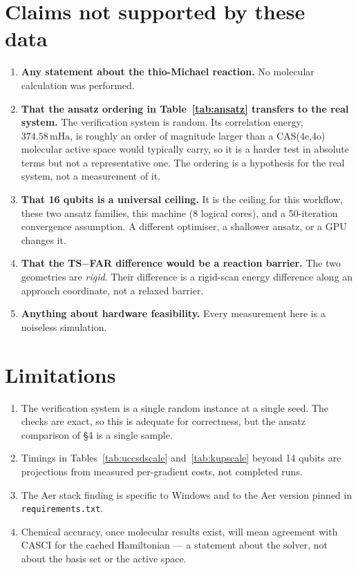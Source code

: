 \documentclass[11pt,a4paper]{article}
\newcommand{\mHa}{\ensuremath{\,\mathrm{mHa}}}
\newcommand{\code}[1]{\texttt{\small #1}}
\begin{document}
\section{Claims not supported by these data}

\begin{enumerate}[leftmargin=1.4em,itemsep=0.3em]

\item \textbf{Any statement about the thio-Michael reaction.} No molecular
  calculation was performed.

\item \textbf{That the ansatz ordering in Table~\ref{tab:ansatz} transfers to
  the real system.} The verification system is random. Its correlation energy,
  $374.58\mHa$, is roughly an order of magnitude larger than a CAS(4e,4o)
  molecular active space would typically carry, so it is a harder test in
  absolute terms but not a representative one. The ordering is a hypothesis for
  the real system, not a measurement of it.

\item \textbf{That 16 qubits is a universal ceiling.} It is the ceiling for
  this workflow, these two ansatz families, this machine (8 logical cores), and
  a 50-iteration convergence assumption. A different optimiser, a shallower
  ansatz, or a GPU changes it.

\item \textbf{That the TS$-$FAR difference would be a reaction barrier.} The two
  geometries are \emph{rigid}. Their difference is a rigid-scan energy
  difference along an approach coordinate, not a relaxed barrier.

\item \textbf{Anything about hardware feasibility.} Every measurement here is a
  noiseless simulation.

\end{enumerate}

\section{Limitations}

\begin{enumerate}[leftmargin=1.4em,itemsep=0.2em]
\item The verification system is a single random instance at a single seed. The
  checks are exact, so this is adequate for correctness, but the ansatz
  comparison of \S4 is a single sample.
\item Timings in Tables~\ref{tab:uccsdscale} and~\ref{tab:kupscale} beyond 14
  qubits are projections from measured per-gradient costs, not completed runs.
\item The Aer stack finding is specific to Windows and to the Aer version
  pinned in \code{requirements.txt}.
\item Chemical accuracy, once molecular results exist, will mean agreement with
  CASCI for the cached Hamiltonian --- a statement about the solver, not about
  the basis set or the active space.
\end{enumerate}
\end{document}
